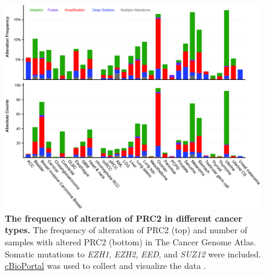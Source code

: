 \begin{figure}[ht]
\centering
\includegraphics[width=155mm]{figures/aim3/FIG_number-of-samples.jpg}
\caption{
    \textbf{The frequency of alteration of PRC2 in different cancer types.}
    The frequency of alteration of PRC2 (top) and number of samples with altered PRC2 (bottom) in The Cancer Genome Atlas. Somatic mutations to \emph{EZH1}, \emph{EZH2}, \emph{EED}, and \emph{SUZ12} were included. \href{https://www.cbioportal.org/results/cancerTypesSummary?Action=Submit&RPPA_SCORE_THRESHOLD=2.0&Z_SCORE_THRESHOLD=2.0&cancer_study_list=laml_tcga_pan_can_atlas_2018\%2Cacc_tcga_pan_can_atlas_2018\%2Cblca_tcga_pan_can_atlas_2018\%2Clgg_tcga_pan_can_atlas_2018\%2Cbrca_tcga_pan_can_atlas_2018\%2Ccesc_tcga_pan_can_atlas_2018\%2Cchol_tcga_pan_can_atlas_2018\%2Ccoadread_tcga_pan_can_atlas_2018\%2Cdlbc_tcga_pan_can_atlas_2018\%2Cesca_tcga_pan_can_atlas_2018\%2Cgbm_tcga_pan_can_atlas_2018\%2Chnsc_tcga_pan_can_atlas_2018\%2Ckich_tcga_pan_can_atlas_2018\%2Ckirc_tcga_pan_can_atlas_2018\%2Ckirp_tcga_pan_can_atlas_2018\%2Clihc_tcga_pan_can_atlas_2018\%2Cluad_tcga_pan_can_atlas_2018\%2Clusc_tcga_pan_can_atlas_2018\%2Cmeso_tcga_pan_can_atlas_2018\%2Cov_tcga_pan_can_atlas_2018\%2Cpaad_tcga_pan_can_atlas_2018\%2Cpcpg_tcga_pan_can_atlas_2018\%2Cprad_tcga_pan_can_atlas_2018\%2Csarc_tcga_pan_can_atlas_2018\%2Cskcm_tcga_pan_can_atlas_2018\%2Cstad_tcga_pan_can_atlas_2018\%2Ctgct_tcga_pan_can_atlas_2018\%2Cthym_tcga_pan_can_atlas_2018\%2Cthca_tcga_pan_can_atlas_2018\%2Cucs_tcga_pan_can_atlas_2018\%2Cucec_tcga_pan_can_atlas_2018\%2Cuvm_tcga_pan_can_atlas_2018&case_set_id=all&data_priority=0&gene_list=EZH2\%252C\%2520EZH1\%252CEED\%252CSUZ12&geneset_list=\%20&profileFilter=0&tab_index=tab_visualize}{cBioPortal} was used to collect and visualize the data \cite{Cerami2012, Gao2013}.
}
\label{fig:num-samples-prc2}
\end{figure}

